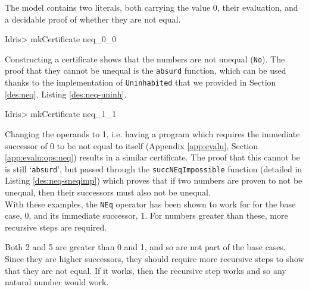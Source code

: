         
        The \Idris model contains two literals, both carrying the value 0, their evaluation, and a decidable proof of whether they are not equal.
        
        \begin{code}
Idris> mkCertificate neq_0_0
        \end{code}
        
        Constructing a certificate shows that the numbers are not unequal (\texttt{No}). The proof that they cannot be unequal is the \texttt{absurd} function, which can be used thanks to the implementation of \texttt{Uninhabited} that we provided in Section \ref{des:neq}, Listing \ref{des:neq-uninh}.
        
        \begin{code}
Idris> mkCertificate neq_1_1
        \end{code}
        
        Changing the operands to 1, i.e. having a program which requires the immediate successor of 0 to be not equal to itself (Appendix \ref{app:evaln}, Section \ref{app:evaln:ops:neq}) results in a similar certificate. The proof that this cannot be is still `\texttt{absurd}', but passed through the \texttt{succNEqImpossible} function (detailed in Listing \ref{des:neq-sneqimp}) which proves that if two numbers are proven to not be unequal, then their successors must also not be unequal.
        \\
        
        With these examples, the \texttt{NEq} operator has been shown to work for for the base case, 0, and its immediate successor, 1. For numbers greater than these, more recursive steps are required.
        
        \newpage
    
        
        
        Both 2 and 5 are greater than 0 and 1, and so are not part of the base cases. Since they are higher successors, they should require more recursive steps to show that they are not equal. If it works, then the recursive step works and so any natural number would work.
        
        

